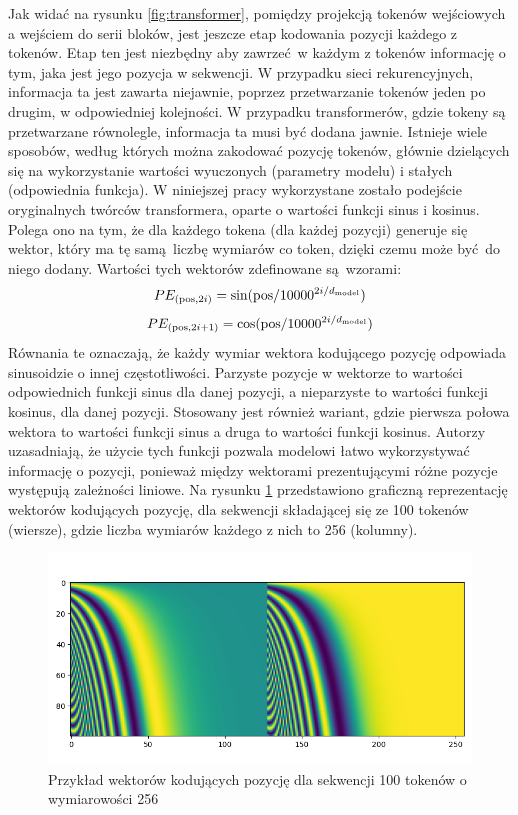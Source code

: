Jak widać na rysunku \ref{fig:transformer}, pomiędzy projekcją tokenów wejściowych a wejściem do
serii bloków, jest jeszcze etap kodowania pozycji każdego z tokenów. Etap ten jest niezbędny aby
zawrzeć w każdym z tokenów informację o tym, jaka jest jego pozycja w sekwencji. W przypadku sieci
rekurencyjnych, informacja ta jest zawarta niejawnie, poprzez przetwarzanie tokenów jeden po drugim,
w odpowiedniej kolejności. W przypadku transformerów, gdzie tokeny są przetwarzane równolegle,
informacja ta musi być dodana jawnie.  Istnieje wiele sposobów, według których można zakodować
pozycję tokenów, głównie dzielących się na wykorzystanie wartości wyuczonych (parametry modelu) i
stałych (odpowiednia funkcja).  W niniejszej pracy wykorzystane zostało podejście oryginalnych
twórców transformera, oparte o wartości funkcji sinus i kosinus. Polega ono na tym, że dla każdego
tokena (dla każdej pozycji) generuje się wektor, który ma tę samą liczbę wymiarów co token, dzięki
czemu może być do niego dodany. Wartości tych wektorów zdefinowane są wzorami:
\begin{equation}
    PE_{(\textrm{pos},2i)} = \sin(\textrm{pos}/10000^{2i/d_{\textrm{\tiny model}}})
\end{equation}
\begin{equation}
PE_{(\textrm{pos},2i + 1)} = \cos(\textrm{pos}/10000^{2i/d_{\textrm{\tiny model}}})
\end{equation}
Równania te oznaczają, że każdy wymiar wektora kodującego pozycję odpowiada sinusoidzie o innej
częstotliwości. Parzyste pozycje w wektorze to wartości odpowiednich funkcji sinus dla danej
pozycji, a nieparzyste to wartości funkcji kosinus, dla danej pozycji. Stosowany jest również
wariant, gdzie pierwsza połowa wektora to wartości funkcji sinus a druga to wartości funkcji
kosinus. Autorzy uzasadniają, że użycie tych funkcji pozwala modelowi łatwo wykorzystywać informację
o pozycji, ponieważ między wektorami prezentującymi różne pozycje występują zależności liniowe. Na
rysunku \ref{fig:positional_encoding} przedstawiono graficzną reprezentację wektorów kodujących
pozycję, dla sekwencji składającej się ze 100 tokenów (wiersze), gdzie liczba wymiarów każdego z
nich to 256 (kolumny).
\begin{figure}
    \centering
    \includegraphics[width=1.0\textwidth]{./images/positional_encoding.png}
    \caption{Przykład wektorów kodujących pozycję dla sekwencji 100 tokenów o wymiarowości 256}
    \label{fig:positional_encoding}
\end{figure}

